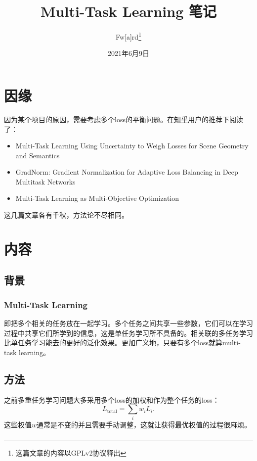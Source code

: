 \documentclass[a4paper,punct]{ctexart}
\title{Multi-Task Learning 笔记}
\author{Fw[a]rd\thanks{这篇文章的内容以GPLv2协议释出}}
\date{2021年6月9日}
\begin{document}
\maketitle

\section{因缘}
因为某个项目的原因，需要考虑多个loss的平衡问题。在\href{https://www.zhihu.com/question/375794498}{知乎}用户的推荐下阅读了：

\begin{itemize}
    \item Multi-Task Learning Using Uncertainty to Weigh Losses for Scene Geometry and Semantics\cite{Kendall18Uncertainty}
    \item GradNorm: Gradient Normalization for Adaptive Loss Balancing in Deep Multitask Networks\cite{Chen18GradNorm}
    \item Multi-Task Learning as Multi-Objective Optimization\cite{Sener18Pareto}
\end{itemize}

这几篇文章各有千秋，方法论不尽相同。

\section{内容}
\subsection{背景}
\subsubsection{Multi-Task Learning}
即把多个相关的任务放在一起学习。多个任务之间共享一些参数，它们可以在学习过程中共享它们所学到的信息，这是单任务学习所不具备的。相关联的多任务学习比单任务学习能去的更好的泛化效果。更加广义地，只要有多个loss就算multi-task learning。

\subsection{方法}

之前多重任务学习问题大多采用多个loss的加权和作为整个任务的loss：
\begin{equation}
    L_\mathrm{total} = \sum_i w_iL_i.
\end{equation}
这些权值$w$通常是不变的并且需要手动调整，这就让获得最优权值的过程很麻烦。

\subsubsection{}
\end{document}
